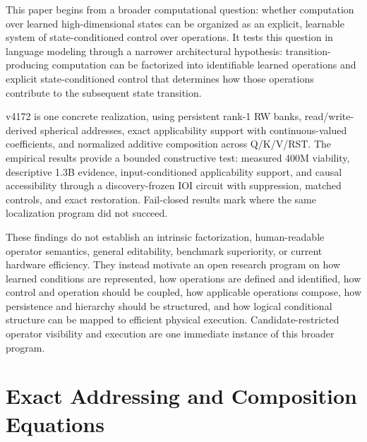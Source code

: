 \documentclass{article}
\begin{document}
This paper begins from a broader computational question: whether computation
over learned high-dimensional states can be organized as an explicit, learnable
system of state-conditioned control over operations. It tests this question in
language modeling through a narrower architectural hypothesis:
transition-producing computation can be factorized into identifiable learned
operations and explicit state-conditioned control that determines how those
operations contribute to the subsequent state transition.

v4172 is one concrete realization, using persistent rank-1 RW banks,
read/write-derived spherical addresses, exact applicability support with
continuous-valued coefficients, and normalized additive composition across
Q/K/V/RST. The empirical results provide a bounded constructive test: measured
400M viability, descriptive 1.3B evidence, input-conditioned applicability
support, and causal accessibility through a discovery-frozen IOI circuit with
suppression, matched controls, and exact restoration. Fail-closed results mark
where the same localization program did not succeed.

These findings do not establish an intrinsic factorization, human-readable
operator semantics, general editability, benchmark superiority, or current
hardware efficiency. They instead motivate an open research program on how
learned conditions are represented, how operations are defined and identified,
how control and operation should be coupled, how applicable operations compose,
how persistence and hierarchy should be structured, and how logical conditional
structure can be mapped to efficient physical execution. Candidate-restricted
operator visibility and execution are one immediate instance of this broader
program.

\appendix

\section{Exact Addressing and Composition Equations}
\label{app:equations}
\end{document}

